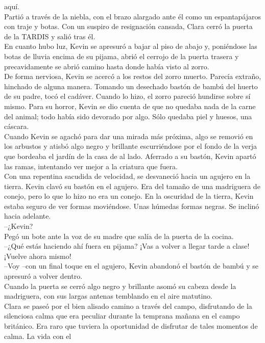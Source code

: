 aquí.\\
Partió a través de la niebla, con el brazo alargado ante él como un
espantapájaros con traje y botas. Con un suspiro de resignación cansada,
Clara cerró la puerta de la TARDIS y salió tras él.\\[2\baselineskip]En
cuanto hubo luz, Kevin se apresuró a bajar al piso de abajo y,
poniéndose las botas de lluvia encima de su pijama, abrió el cerrojo de
la puerta trasera y precavidamente se abrió camino hasta donde había
visto al zorro.\\
De forma nerviosa, Kevin se acercó a los restos del zorro muerto.
Parecía extraño, hinchado de alguna manera. Tomando un desechado bastón
de bambú del huerto de su padre, tocó el cadáver. Cuando lo hizo, el
zorro pareció hundirse sobre sí mismo. Para su horror, Kevin se dio
cuenta de que no quedaba nada de la carne del animal; todo había sido
devorado por algo. Sólo quedaba piel y huesos, una cáscara.\\
Cuando Kevin se agachó para dar una mirada más próxima, algo se removió
en los arbustos y atisbó algo negro y brillante escurriéndose por el
fondo de la verja que bordeaba el jardín de la casa de al lado. Aferrado
a su bastón, Kevin apartó las ramas, intentando ver mejor a la criatura
que fuera.\\
Con una repentina sacudida de velocidad, se desvaneció hacia un agujero
en la tierra. Kevin clavó su bastón en el agujero. Era del tamaño de una
madriguera de conejo, pero lo que lo hizo no era un conejo. En la
oscuridad de la tierra, Kevin estaba seguro de ver formas moviéndose.
Unas húmedas formas negras. Se inclinó hacia adelante.\\
--¿Kevin?\\
Pegó un bote ante la voz de su madre que salía de la puerta de la
cocina.\\
--¿Qué estás haciendo ahí fuera en pijama? ¡Vas a volver a llegar tarde
a clase! ¡Vuelve ahora mismo!\\
--Voy --con un final toque en el agujero, Kevin abandonó el bastón de
bambú y se apresuró a volver dentro.\\
Cuando la puerta se cerró algo negro y brillante asomó su cabeza desde
la madriguera, con sus largas antenas temblando en el aire
matutino.\\[2\baselineskip]Clara se paseó por el bien alisado camino a
través del campo, disfrutando de la silenciosa calma que era peculiar
durante la temprana mañana en el campo británico. Era raro que tuviera
la oportunidad de disfrutar de tales momentos de calma. La vida con el
